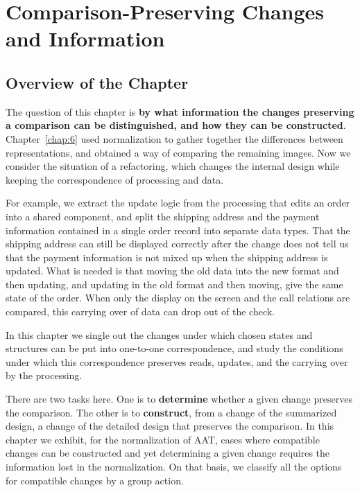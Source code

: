 \chapter{Comparison-Preserving Changes and Information}\label{chap:7}

\section*{Overview of the Chapter}

The question of this chapter is \textbf{by what information the changes preserving a
comparison can be distinguished, and how they can be constructed}.
Chapter~\ref{chap:6} used normalization to gather together the differences between
representations, and obtained a way of comparing the remaining images.
Now we consider the situation of a refactoring, which changes the internal design while
keeping the correspondence of processing and data.

For example, we extract the update logic from the processing that edits an order into a
shared component, and split the shipping address and the payment information contained in a
single order record into separate data types.
That the shipping address can still be displayed correctly after the change does not tell us
that the payment information is not mixed up when the shipping address is updated.
What is needed is that moving the old data into the new format and then updating, and updating
in the old format and then moving, give the same state of the order.
When only the display on the screen and the call relations are compared, this carrying over
of data can drop out of the check.

In this chapter we single out the changes under which chosen states and structures can be put
into one-to-one correspondence, and study the conditions under which this correspondence
preserves reads, updates, and the carrying over by the processing.

There are two tasks here. One is to \textbf{determine} whether a given change preserves the
comparison.
The other is to \textbf{construct}, from a change of the summarized design, a change of the
detailed design that preserves the comparison.
In this chapter we exhibit, for the normalization of AAT, cases where compatible changes can
be constructed and yet determining a given change requires the information lost in the
normalization.
On that basis, we classify all the options for compatible changes by a group action.

